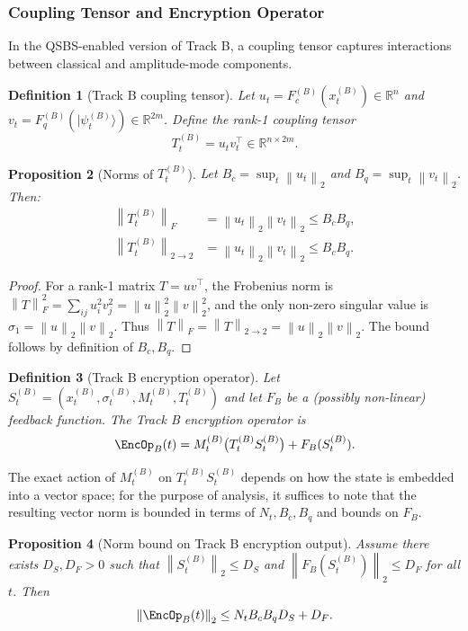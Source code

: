 \documentclass[11pt]{article}
\newtheorem{definition}{Definition}[section]
\newtheorem{proposition}[definition]{Proposition}
\newcommand{\R}{\mathbb{R}}
\newcommand{\norm}[1]{\left\lVert #1 \right\rVert}
\begin{document}
\subsubsection{Coupling Tensor and Encryption Operator}

In the QSBS-enabled version of Track B, a coupling tensor captures interactions between classical and amplitude-mode components.

\begin{definition}[Track B coupling tensor]
Let \(u_t = F_c^{(B)}(x_t^{(B)}) \in \R^n\) and \(v_t = F_q^{(B)}(|\psi_t^{(B)}\rangle) \in \R^{2m}\).
Define the rank-1 coupling tensor
\[
  T_t^{(B)} = u_t v_t^\top \in \R^{n \times 2m}.
\]
\end{definition}

\begin{proposition}[Norms of \(T_t^{(B)}\)]
Let \(B_c = \sup_t \norm{u_t}_2\) and \(B_q = \sup_t \norm{v_t}_2\).
Then:
\begin{align*}
  \norm{T_t^{(B)}}_F &= \norm{u_t}_2 \norm{v_t}_2 \le B_c B_q, \\
  \norm{T_t^{(B)}}_{2\to 2} &= \norm{u_t}_2 \norm{v_t}_2 \le B_c B_q.
\end{align*}
\end{proposition}

\begin{proof}
For a rank-1 matrix \(T = u v^\top\), the Frobenius norm is
\(
\norm{T}_F^2 = \sum_{ij} u_i^2 v_j^2 = \norm{u}_2^2 \norm{v}_2^2
\),
and the only non-zero singular value is \(\sigma_1 = \norm{u}_2\norm{v}_2\).
Thus \(\norm{T}_F = \norm{T}_{2\to 2} = \norm{u}_2\norm{v}_2\).
The bound follows by definition of \(B_c,B_q\).
\end{proof}

\begin{definition}[Track B encryption operator]
Let \(S_t^{(B)} = (x_t^{(B)}, \sigma_t^{(B)}, M_t^{(B)}, T_t^{(B)})\) and let \(F_B\) be a (possibly non-linear) feedback function.
The Track B encryption operator is
\[
  \EncOp_B(t) = M_t^{(B)} \bigl( T_t^{(B)} S_t^{(B)} \bigr) + F_B(S_t^{(B)}).
\]
\end{definition}

The exact action of \(M_t^{(B)}\) on \(T_t^{(B)} S_t^{(B)}\) depends on how the state is embedded into a vector space;
for the purpose of analysis, it suffices to note that the resulting vector norm is bounded in terms of \(N_t, B_c, B_q\) and bounds on \(F_B\).

\begin{proposition}[Norm bound on Track B encryption output]
Assume there exists \(D_S, D_F > 0\) such that \(\norm{S_t^{(B)}}_2 \le D_S\) and \(\norm{F_B(S_t^{(B)})}_2 \le D_F\) for all \(t\).
Then
\[
  \norm{\EncOp_B(t)}_2 \le N_t B_c B_q D_S + D_F.
\]
\end{proposition}
\end{document}
